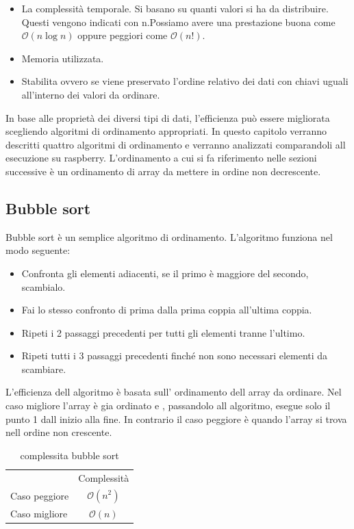 \documentclass[12pt,a4paper]{report}
\begin{document}
\begin{itemize}
	\item La complessità temporale.  Si basano su quanti valori si ha da distribuire. Questi vengono indicati con n.Possiamo avere una prestazione buona come $\mathcal{O}(n\log{}n)$ oppure peggiori come $\mathcal{O}(n!)$.
	\item Memoria utilizzata.
	\item Stabilita ovvero se viene preservato l'ordine relativo dei dati con chiavi uguali all'interno dei valori da ordinare.
\end{itemize}

In base alle proprietà dei diversi tipi di dati, l'efficienza può essere migliorata scegliendo algoritmi di ordinamento appropriati. In questo capitolo verranno descritti quattro algoritmi di ordinamento e verranno analizzati comparandoli all esecuzione su raspberry. L'ordinamento a cui si fa riferimento nelle sezioni successive è un ordinamento di array da mettere in ordine non decrescente.

\subsection{Bubble sort}
Bubble sort è un semplice algoritmo di ordinamento. 
L'algoritmo funziona nel modo seguente:
\begin{itemize}
	\item Confronta gli elementi adiacenti, se il primo è maggiore del secondo, scambialo.
	\item Fai lo stesso confronto di prima dalla prima coppia all'ultima coppia. 
	\item Ripeti i 2 passaggi precedenti per tutti gli elementi tranne l'ultimo.
	\item Ripeti tutti i 3 passaggi precedenti finché non sono necessari elementi da scambiare.
\end{itemize}
L'efficienza dell algoritmo è basata sull' ordinamento dell array da ordinare. Nel caso migliore l'array è gia ordinato e , passandolo all algoritmo, esegue solo il punto 1 dall inizio alla fine. In contrario il caso peggiore è quando l'array si trova nell ordine non crescente.
\begin{table}[h]
	\centering
	\begin{tabular}{lc}
              & Complessità \\
Caso peggiore &       $ \mathcal{O}(n^2)$      \\
Caso migliore &           $ \mathcal{O}(n)$   \\
\end{tabular}
	\caption{complessita bubble sort}
	\label{Tab:CompBubbleSort}
\end{table}
\end{document}
